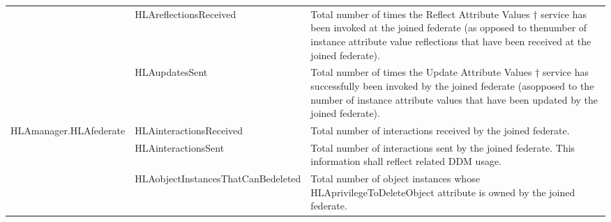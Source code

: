 \begin{landscape}
\begin{momtabletypeset}[8.00]
{{\begin{tabular}{|Y{110.17pt}|Y{128.60pt}|Y{391.97pt}|}
                    & HLAreflectionsReceived                       & Total number of times the Reflect Attribute Values † service has been invoked at the joined federate (as opposed to the\allowbreak{}number of instance attribute value reflections that have been received at the joined federate).\allowbreak{}                                                                                                                                                                                                                                           \\
                    & HLAupdatesSent                               & Total number of times the Update Attribute Values † service has successfully been invoked by the joined federate (as\allowbreak{}opposed to the number of instance attribute values that have been updated by the joined federate).\allowbreak{}                                                                                                                                                                                                                                           \\
                    \hline
                    HLAmanager.\allowbreak{}HLAfederate      & HLAinteractionsReceived                      & Total number of interactions received by the joined federate.\allowbreak{}                                                                                                                                                                                                                                                                                                                                                                                                                 \\
                    & HLAinteractionsSent                          & Total number of interactions sent by the joined federate.\allowbreak{} This information shall reflect related DDM usage.\allowbreak{}                                                                                                                                                                                                                                                                                                                                                      \\
                    & HLAobjectInstancesThatCanBedeleted           & Total number of object instances whose HLAprivilegeToDeleteObject attribute is owned by the joined federate.\allowbreak{}                                                                                                                                                                                                                                                                                                                                                                  \\

\end{tabular}}}
\end{momtabletypeset}
\end{landscape}
